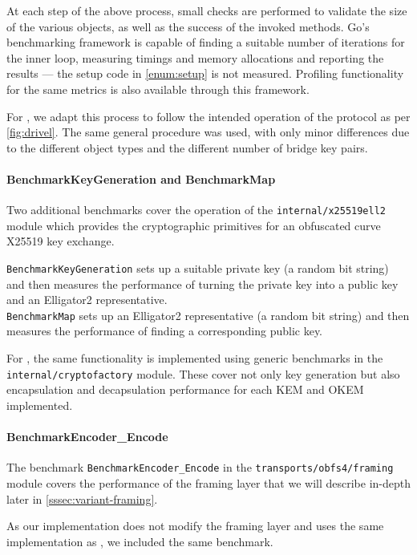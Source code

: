 At each step of the above process, small checks are performed to validate the size of the various objects, as well as the success of the invoked methods. Go's benchmarking framework is capable of finding a suitable number of iterations for the inner loop, measuring timings and memory allocations and reporting the results --- the setup code in \cref{enum:setup} is not measured. Profiling functionality for the same metrics is also available through this framework.

For \drivel{}, we adapt this process to follow the intended operation of the protocol as per \cref{fig:drivel}. The same general procedure was used, with only minor differences due to the different object types and the different number of bridge key pairs.

\paragraph{BenchmarkKeyGeneration and BenchmarkMap}
Two additional benchmarks cover the operation of the \texttt{internal/x25519ell2} module which provides the cryptographic primitives for an obfuscated curve X25519 key exchange.

\texttt{BenchmarkKeyGeneration} sets up a suitable private key (a random bit string) and then measures the performance of turning the private key into a public key and an Elligator2 representative.\\
\texttt{BenchmarkMap} sets up an Elligator2 representative (a random bit string) and then measures the performance of finding a corresponding public key.

For \drivel{}, the same functionality is implemented using generic benchmarks in the \texttt{internal/cryptofactory} module. These cover not only key generation but also encapsulation and decapsulation performance for each KEM and OKEM implemented.

\paragraph{BenchmarkEncoder\_Encode}
The benchmark \texttt{BenchmarkEncoder\_Encode} in the \texttt{transports/obfs4/framing} module covers the performance of the framing layer that we will describe in-depth later in \cref{sssec:variant-framing}.

As our implementation does not modify the framing layer and uses the same implementation as \obfsfour{}, we included the same benchmark.

